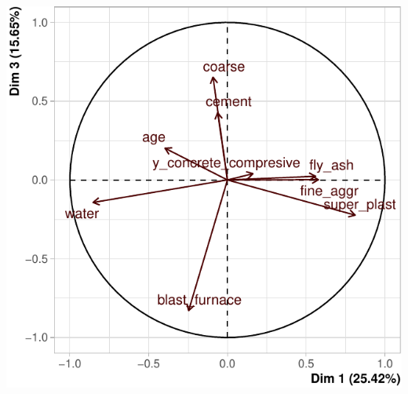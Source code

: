 \documentclass[
  12pt,
]{article}
\begin{document}
\begin{center}\includegraphics{rmd_final_files/figure-latex/unnamed-chunk-31-1} \end{center}
\end{document}
